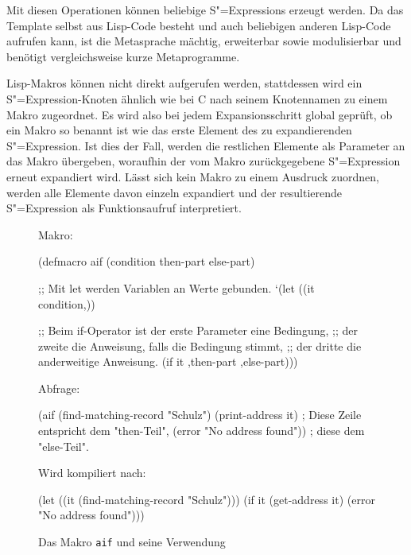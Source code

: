 \documentclass[11pt, a4paper, bibgerm]{scrbook}
\newcommand\icode[1]{\lstinline?#1?}
\newcommand{\sexp}{S"=Expression}
\newcommand{\sexps}{S"=Expressions}
\begin{document}
Mit diesen Operationen können beliebige \sexps{} erzeugt werden. Da das
Template selbst aus Lisp-Code besteht und auch beliebigen anderen
Lisp-Code aufrufen kann, ist die Metasprache mächtig, erweiterbar sowie
modulisierbar und benötigt vergleichsweise kurze
Metaprogramme.

Lisp-Makros können nicht direkt aufgerufen werden, stattdessen wird ein
\sexp{}-Knoten ähnlich wie bei C nach seinem Knotennamen zu einem Makro
zugeordnet. Es wird also bei jedem Expansionsschritt global geprüft, ob
ein Makro so benannt ist wie das erste Element des zu expandierenden
\sexp{}. Ist dies der Fall, werden die restlichen Elemente als Parameter
an das Makro übergeben, woraufhin der vom Makro zurückgegebene \sexp{}
erneut expandiert wird. Lässt sich kein Makro zu einem Ausdruck
zuordnen, werden alle Elemente davon einzeln expandiert und der
resultierende \sexp{} als Funktionsaufruf interpretiert.

\begin{figure}[h]
  \centering
  \begin{code}
Makro:

(defmacro aif (condition then-part else-part)

  ;; Mit let werden Variablen an Werte gebunden.
  `(let ((it condition,))             

      ;; Beim if-Operator ist der erste Parameter eine Bedingung,
      ;; der zweite die Anweisung, falls die Bedingung stimmt,
      ;; der dritte die anderweitige Anweisung.
      (if it ,then-part ,else-part)))


Abfrage:

(aif (find-matching-record "Schulz")
  (print-address it)            ; Diese Zeile entspricht dem "then-Teil",
  (error "No address found"))   ; diese dem "else-Teil".


Wird kompiliert nach:

(let ((it (find-matching-record "Schulz")))
  (if it
      (get-address it)
      (error "No address found")))    
  \end{code}
  \caption{Das Makro \icode{aif} und seine Verwendung}
  \label{magicl:fig:lisp-aif}
\end{figure}
\end{document}
